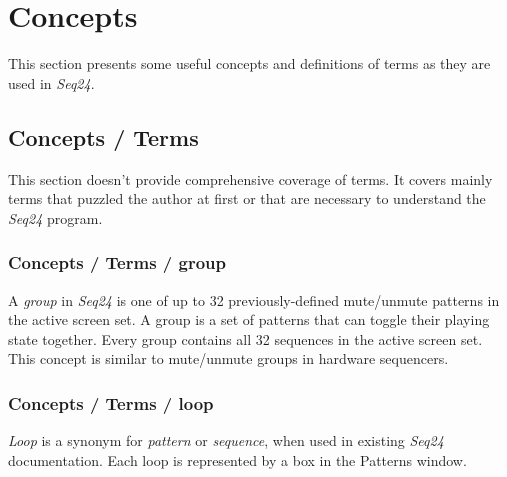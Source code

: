 %
%
%

\section{Concepts}
\label{sec:concepts}

   This section presents some useful concepts and definitions of terms as
   they are used in \textsl{Seq24}.

\subsection{Concepts / Terms}
\label{subsec:concepts_terms}

   This section doesn't provide comprehensive coverage of terms.  It
   covers mainly terms that puzzled the author at first or that are
   necessary to understand the \textsl{Seq24} program.

\subsubsection{Concepts / Terms / group}
\label{subsubsec:concepts_terms_group}

   A \textsl{group} in \textsl{Seq24} is one of up to 32 previously-defined
   mute/unmute patterns in the active screen set.
   A group is a set of patterns that can toggle their playing state
   together.  Every group contains all 32 sequences in the active screen
   set.  This concept is similar to mute/unmute groups in hardware
   sequencers.

\subsubsection{Concepts / Terms / loop}
\label{subsubsec:concepts_terms_loop}

   \textsl{Loop}
   is a synonym for \textsl{pattern} or \textsl{sequence}, when used
   in existing \textsl{Seq24} documentation.
   Each loop is represented by a box in the Patterns window.

